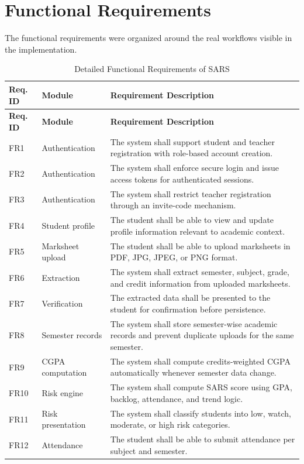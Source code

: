 \section{Functional Requirements}
The functional requirements were organized around the real workflows visible in the implementation.

\begin{longtable}{p{}p{}p{}}
\caption{Detailed Functional Requirements of SARS}\\
\toprule
\textbf{Req. ID} & \textbf{Module} & \textbf{Requirement Description} \\
\midrule
\endfirsthead
\toprule
\textbf{Req. ID} & \textbf{Module} & \textbf{Requirement Description} \\
\midrule
\endhead
FR1 & Authentication & The system shall support student and teacher registration with role-based account creation. \\
FR2 & Authentication & The system shall enforce secure login and issue access tokens for authenticated sessions. \\
FR3 & Authentication & The system shall restrict teacher registration through an invite-code mechanism. \\
FR4 & Student profile & The student shall be able to view and update profile information relevant to academic context. \\
FR5 & Marksheet upload & The student shall be able to upload marksheets in PDF, JPG, JPEG, or PNG format. \\
FR6 & Extraction & The system shall extract semester, subject, grade, and credit information from uploaded marksheets. \\
FR7 & Verification & The extracted data shall be presented to the student for confirmation before persistence. \\
FR8 & Semester records & The system shall store semester-wise academic records and prevent duplicate uploads for the same semester. \\
FR9 & CGPA computation & The system shall compute credits-weighted CGPA automatically whenever semester data change. \\
FR10 & Risk engine & The system shall compute SARS score using GPA, backlog, attendance, and trend logic. \\
FR11 & Risk presentation & The system shall classify students into low, watch, moderate, or high risk categories. \\
FR12 & Attendance & The student shall be able to submit attendance per subject and semester. \\

\end{longtable}
